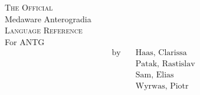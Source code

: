 \thispagestyle{plain}
\vspace*{\fill}
\begin{center}
{\LARGE\textsc{The Official}}
	\\[5mm]
	{\Huge Medaware Anterogradia\texttrademark}\\[5mm]
	{\LARGE\textsc{Language Reference}} \\[10mm]
	\large For ANTG \antgversion \\[2.5mm]
	\normalsize
	\begin{align*}
		\text{by}    \quad    &\text{Haas, Clarissa} \\
		&\text{Patak, Rastislav} \\
		&\text{Sam, Elias} \\
		&\text{Wyrwas, Piotr}
	\end{align*} \\[2.5mm]
\end{center}
\vspace*{\fill}
\newpage
